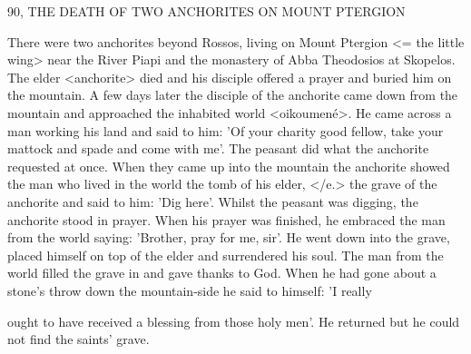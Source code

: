 90, THE DEATH OF TWO ANCHORITES
ON MOUNT PTERGION

There were two anchorites beyond Rossos, living on Mount
Ptergion <= the little wing> near the River Piapi and the monastery
of Abba Theodosios at Skopelos. The elder <anchorite> died and
his disciple offered a prayer and buried him on the mountain. A few
days later the disciple of the anchorite came down from the
mountain and approached the inhabited world <oikoumené>. He
came across a man working his land and said to him: 'Of your
charity good fellow, take your mattock and spade and come with
me'. The peasant did what the anchorite requested at once. When
they came up into the mountain the anchorite showed the man who
lived in the world the tomb of his elder, </e.> the grave of the
anchorite and said to him: 'Dig here'. Whilst the peasant was
digging, the anchorite stood in prayer. When his prayer was
finished, he embraced the man from the world saying: 'Brother, pray
for me, sir'. He went down into the grave, placed himself on top of
the elder and surrendered his soul. The man from the world filled
the grave in and gave thanks to God. When he had gone about a
stone's throw down the mountain-side he said to himself: 'I really

ought to have received a blessing from those holy men'. He returned
but he could not find the saints' grave.

